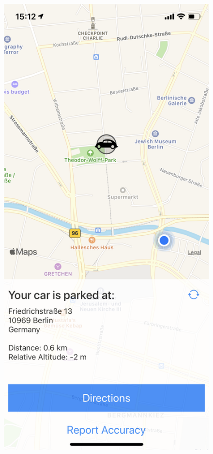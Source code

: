 \begin{figure}[h!]
\begin{minipage}{.33\textwidth}
  \centering
  \includegraphics[width=.9\linewidth]{images/App/detail.png}
\end{minipage}
\begin{minipage}{.33\textwidth}
  \centering

\end{minipage}
\end{figure}
